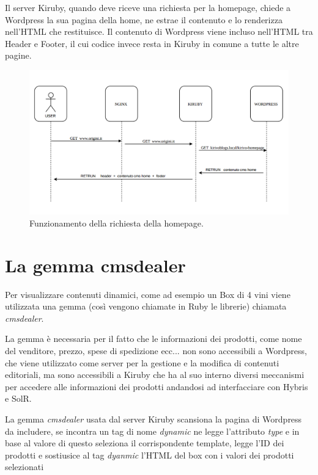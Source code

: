 \newpage

Il server Kiruby, quando deve riceve una richiesta per la homepage, chiede a Wordpress la sua pagina della home, ne estrae
il contenuto e lo renderizza nell'HTML che restituisce. Il contenuto di Wordpress viene incluso nell'HTML tra Header e Footer, il cui codice invece resta in Kiruby in comune a tutte le altre pagine.


\begin{figure}
  \includegraphics[width=\textwidth]{figure/homeseq.png}
  \caption{Funzionamento della richiesta della homepage.}
  \label{fig:homeseq}
\end{figure}



\section{La gemma cmsdealer}
Per visualizzare contenuti dinamici, come ad esempio un Box di 4 vini viene utilizzata
una gemma (così vengono chiamate in Ruby le librerie) chiamata \emph{cmsdealer}.

La gemma è necessaria per il fatto che le informazioni dei prodotti, come nome del venditore, prezzo, spese di spedizione ecc... non sono accessibili a Wordpress, che viene utilizzato
come server per la gestione e la modifica di contenuti editoriali, ma sono accessibili a Kiruby che ha al suo interno diversi
meccanismi per accedere alle informazioni dei prodotti andandosi ad interfacciare con Hybris e SolR.

La gemma \emph{cmsdealer} usata dal server Kiruby scansiona la pagina di Wordpress da includere,
se incontra un tag di nome \emph{dynamic} ne legge l'attributo \emph{type} e in base al valore di questo
seleziona il corrispondente template, legge l'ID dei prodotti e sostiusice al tag \emph{dyanmic} l'HTML del box con
i valori dei prodotti selezionati

